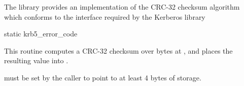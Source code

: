 The  library provides an implementation of the
CRC-32 checksum algorithm which conforms to the interface required by
the Kerberos library

\begin{funcdecl}{static krb5_error_code}{\funcin}
\funcout
{}
\end{funcdecl}

This routine computes a CRC-32 checksum over  bytes
at , and places the resulting value into
.

 must be set by the caller to point
to at least 4 bytes of storage.
